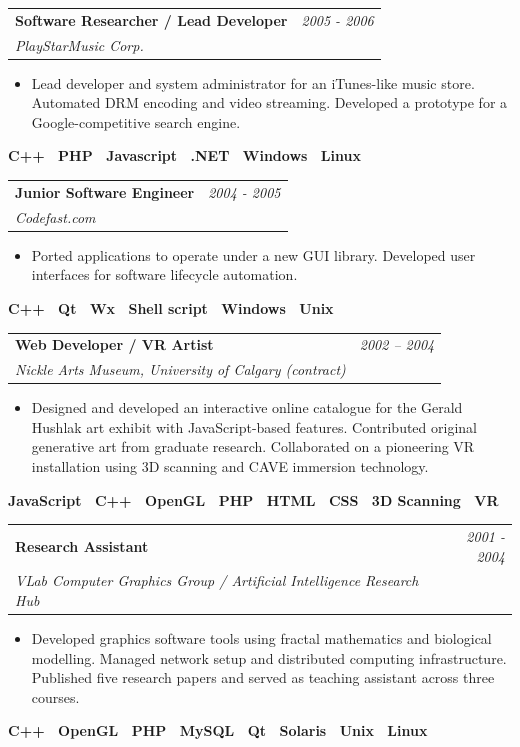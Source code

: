\documentclass[10pt]{article}
\makeatletter
\newcommand{\tech}[1]{\textcolor{secondary}{\textbf{#1}}}
\newcommand{\experience}[4]{%
  \vspace{4pt}
  \begin{tabular*}{\textwidth}{@{}l@{\extracolsep{\fill}}r@{}}
    \textbf{#1} & \textit{#2} \\
    \textit{\small#3} & \textit{\small#4}
  \end{tabular*}
  \vspace{-4pt}
}
\makeatother
\begin{document}
\experience{Software Researcher / Lead Developer}{2005 - 2006}{PlayStarMusic Corp.}{}
\begin{itemize}
    \item Lead developer and system administrator for an iTunes-like music store. Automated DRM encoding and video streaming. Developed a prototype for a Google-competitive search engine.
\end{itemize}
\textbf{\tech{C++} \textbullet\ \tech{PHP} \textbullet\ \tech{Javascript} \textbullet\ \tech{.NET} \textbullet\ \tech{Windows} \textbullet\ \tech{Linux}}

\experience{Junior Software Engineer}{2004 - 2005}{Codefast.com}{}
\begin{itemize}
    \item Ported applications to operate under a new GUI library. Developed user interfaces for software lifecycle automation.
\end{itemize}
\textbf{\tech{C++} \textbullet\ \tech{Qt} \textbullet\ \tech{Wx} \textbullet\ \tech{Shell script} \textbullet\ \tech{Windows} \textbullet\ \tech{Unix}}

\experience{Web Developer / VR Artist}{2002 -- 2004}{Nickle Arts Museum, University of Calgary (contract)}{}
\begin{itemize}
    \item Designed and developed an interactive online catalogue for the Gerald Hushlak art exhibit with JavaScript-based features. Contributed original generative art from graduate research. Collaborated on a pioneering VR installation using 3D scanning and CAVE immersion technology.
\end{itemize}
\textbf{\tech{JavaScript} \textbullet\ \tech{C++} \textbullet\ \tech{OpenGL} \textbullet\ \tech{PHP} \textbullet\ \tech{HTML} \textbullet\ \tech{CSS} \textbullet\ \tech{3D Scanning} \textbullet\ \tech{VR}}

\experience{Research Assistant}{2001 - 2004}{VLab Computer Graphics Group / Artificial Intelligence Research Hub}{}
\begin{itemize}
    \item Developed graphics software tools using fractal mathematics and biological modelling. Managed network setup and distributed computing infrastructure. Published five research papers and served as teaching assistant across three courses.
\end{itemize}
\textbf{\tech{C++} \textbullet\ \tech{OpenGL} \textbullet\ \tech{PHP} \textbullet\ \tech{MySQL} \textbullet\ \tech{Qt} \textbullet\ \tech{Solaris} \textbullet\ \tech{Unix} \textbullet\ \tech{Linux}}
\end{document}
